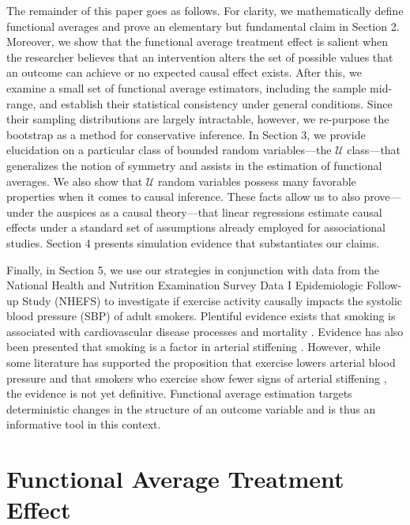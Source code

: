 \documentclass[12pt]{amsart}
\theoremstyle{plain}%
\theoremstyle{definition}
\theoremstyle{remark}
\numberwithin{equation}{section}
\begin{document}
The remainder of this paper goes as follows. For clarity, we mathematically define functional averages and prove an elementary but fundamental claim in Section 2. Moreover, we show that the functional average treatment effect is salient when the researcher believes that an intervention alters the set of possible values that an outcome can achieve or no expected causal effect exists. After this, we examine a small set of functional average estimators, including the sample mid-range, and establish their statistical consistency under general conditions. Since their sampling distributions are largely intractable, however, we re-purpose the bootstrap as a method for conservative inference. In Section 3, we provide elucidation on a particular class of bounded random variables---the $\mathcal{U}$ class---that generalizes the notion of symmetry and assists in the estimation of functional averages. We also show that $\mathcal{U}$ random variables possess many favorable properties when it comes to causal inference. These facts allow us to also prove---under the auspices as a causal theory---that linear regressions estimate causal effects under a standard set of assumptions already employed for associational studies. Section 4 presents simulation evidence that substantiates our claims.

Finally, in Section 5, we use our strategies in conjunction with data from the National Health and Nutrition Examination Survey Data I Epidemiologic Follow-up Study (NHEFS) to investigate if exercise activity causally impacts the systolic blood pressure (SBP) of adult smokers. Plentiful evidence exists that smoking is associated with cardiovascular disease processes and mortality \cite{glantz1991passive, stallones2015association}. Evidence has also been presented that smoking is a factor in arterial stiffening \cite{narkiewicz2005smoking}. However, while some literature has supported the proposition that exercise lowers arterial blood pressure \cite{elley2002aerobic} and that smokers who exercise show fewer signs of arterial stiffening \cite{park2014does}, the evidence is not yet definitive. Functional average estimation targets deterministic changes in the structure of an outcome variable and is thus an informative tool in this context.

\section{Functional Average Treatment Effect}
\end{document}
